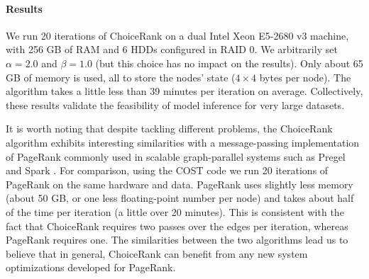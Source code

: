 \paragraph{Results}
We run \num{20} iterations of ChoiceRank on a dual Intel Xeon E5-2680 v3 machine, with \num{256} GB of RAM and \num{6} HDDs configured in RAID 0.
We arbitrarily set $\alpha = 2.0$ and $\beta = 1.0$ (but this choice has no impact on the results).
Only about \num{65} GB of memory is used, all to store the nodes' state ($4 \times 4$ bytes per node).
The algorithm takes a little less than \num{39} minutes per iteration on average.
Collectively, these results validate the feasibility of model inference for very large datasets.

It is worth noting that despite tackling different problems, the ChoiceRank algorithm exhibits interesting similarities with a message-passing implementation of PageRank commonly used in scalable graph-parallel systems such as Pregel \citep{malewicz2010pregel} and Spark \citep{gonzalez2014graphx}.
For comparison, using the COST code \citep{mcsherry2015scalability} we run \num{20} iterations of PageRank on the same hardware and data.
PageRank uses slightly less memory (about \num{50} GB, or one less floating-point number per node) and takes about half of the time per iteration (a little over \num{20} minutes).
This is consistent with the fact that ChoiceRank requires two passes over the edges per iteration, whereas PageRank requires one.
The similarities between the two algorithms lead us to believe that in general, ChoiceRank can benefit from any new system optimizations developed for PageRank.
